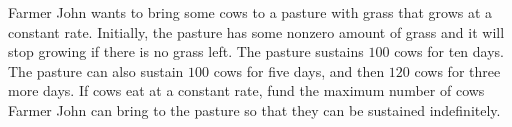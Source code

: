 Farmer John wants to bring some cows to a pasture with grass that grows at a constant rate. Initially, the pasture has some nonzero amount of grass and it will stop growing if there is no grass left. The pasture sustains $100$ cows for ten days. The pasture can also sustain $100$ cows for five days, and then $120$ cows for three more days. If cows eat at a constant rate, fund the maximum number of cows Farmer John can bring to the pasture so that they can be sustained indefinitely.
